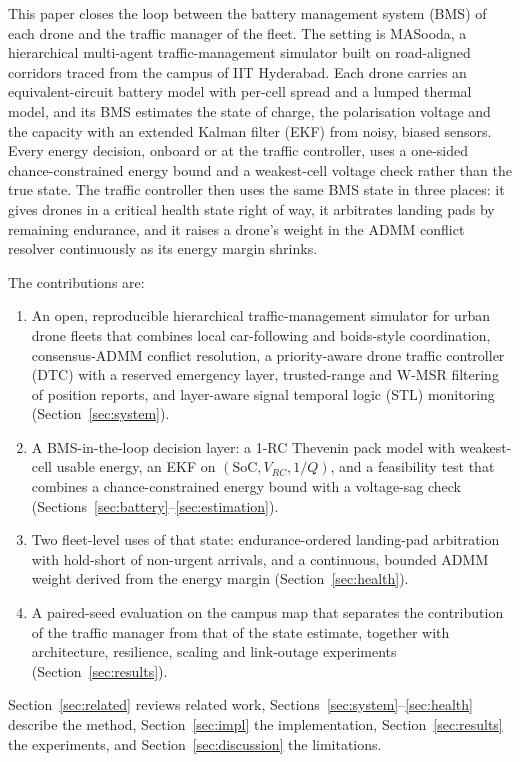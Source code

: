 \documentclass[journal]{IEEEtran}
\begin{document}
This paper closes the loop between the battery management system (BMS) of each drone and the traffic manager of the fleet. The setting is MASooda, a hierarchical multi-agent traffic-management simulator built on road-aligned corridors traced from the campus of IIT Hyderabad. Each drone carries an equivalent-circuit battery model with per-cell spread and a lumped thermal model, and its BMS estimates the state of charge, the polarisation voltage and the capacity with an extended Kalman filter (EKF) from noisy, biased sensors. Every energy decision, onboard or at the traffic controller, uses a one-sided chance-constrained energy bound and a weakest-cell voltage check rather than the true state. The traffic controller then uses the same BMS state in three places: it gives drones in a critical health state right of way, it arbitrates landing pads by remaining endurance, and it raises a drone's weight in the ADMM conflict resolver continuously as its energy margin shrinks.

The contributions are:
\begin{enumerate}
\item An open, reproducible hierarchical traffic-management simulator for urban drone fleets that combines local car-following and boids-style coordination, consensus-ADMM conflict resolution, a priority-aware drone traffic controller (DTC) with a reserved emergency layer, trusted-range and W-MSR filtering of position reports, and layer-aware signal temporal logic (STL) monitoring (Section~\ref{sec:system}).
\item A BMS-in-the-loop decision layer: a 1-RC Thevenin pack model with weakest-cell usable energy, an EKF on $(\mathrm{SoC}, V_{RC}, 1/Q)$, and a feasibility test that combines a chance-constrained energy bound with a voltage-sag check (Sections~\ref{sec:battery}--\ref{sec:estimation}).
\item Two fleet-level uses of that state: endurance-ordered landing-pad arbitration with hold-short of non-urgent arrivals, and a continuous, bounded ADMM weight derived from the energy margin (Section~\ref{sec:health}).
\item A paired-seed evaluation on the campus map that separates the contribution of the traffic manager from that of the state estimate, together with architecture, resilience, scaling and link-outage experiments (Section~\ref{sec:results}).
\end{enumerate}

Section~\ref{sec:related} reviews related work, Sections~\ref{sec:system}--\ref{sec:health} describe the method, Section~\ref{sec:impl} the implementation, Section~\ref{sec:results} the experiments, and Section~\ref{sec:discussion} the limitations.
\end{document}
